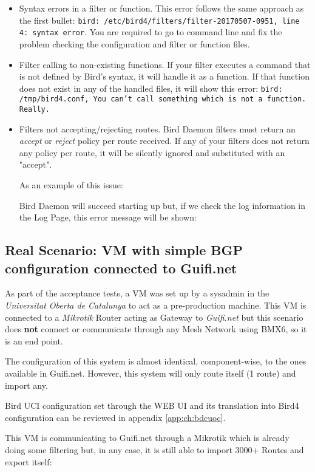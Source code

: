 \begin{itemize}
\item Syntax errors in a filter or function.
This error follows the same approach as the first bullet: \texttt{bird: /etc/bird4/filters/filter-20170507-0951, line 4: syntax error}. You are required to go to command line and fix the problem checking the configuration and filter or function files.

\item Filter calling to non-existing functions.
If your filter executes a command that is not defined by Bird's syntax, it will handle it as a function. If that function does not exist in any of the handled files, it will show this error: \texttt{bird: /tmp/bird4.conf, You can't call something which is not a function. Really.}

\item Filters not accepting/rejecting routes.
Bird Daemon filters must return an \textit{accept} or \textit{reject} policy per route received. If any of your filters does not return any policy per route, it will be silently ignored and substituted with an "accept".

As an example of this issue:


Bird Daemon will succeed starting up but, if we check the log information in the Log Page, this error message will be shown:


\end{itemize}

\subsection{Real Scenario: VM with simple BGP configuration connected to Guifi.net}
As part of the acceptance tests, a VM was set up by a sysadmin in the \textit{Universitat Oberta de Catalunya} to act as a pre-production machine. This VM is connected to a \textit{Mikrotik} Router acting as Gateway to \textit{Guifi.net} but this scenario does \textbf{not} connect or communicate through any Mesh Network using BMX6, so it is an end point.

The configuration of this system is almost identical, component-wise, to the ones available in Guifi.net. However, this system will only route itself (1 route) and import any.

Bird UCI configuration set through the WEB UI and its translation into Bird4 configuration can be reviewed in appendix \ref{app:ch:bdcuoc}.

This VM is communicating to Guifi.net through a Mikrotik which is already doing some filtering but, in any case, it is still able to import 3000+ Routes and export itself:

